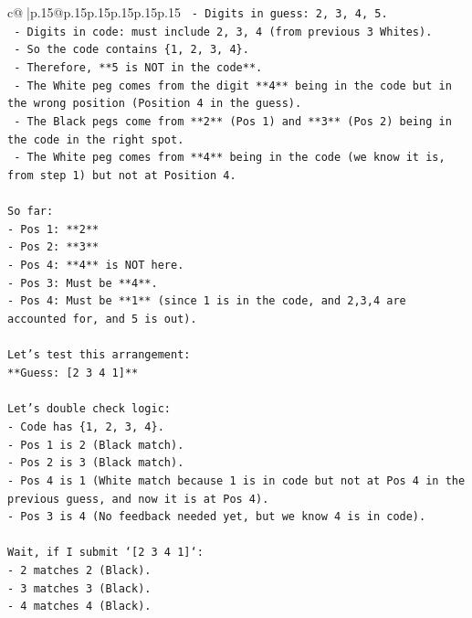 \documentclass{article}
\begin{document}
{\begin{supertabular}{c@{$\;$}|p{.15\linewidth}@{}p{.15\linewidth}p{.15\linewidth}p{.15\linewidth}p{.15\linewidth}p{.15\linewidth}}
{{{\texttt{    {-} Digits in guess: 2, 3, 4, 5.} \\
\texttt{    {-} Digits in code: must include 2, 3, 4 (from previous 3 Whites).} \\
\texttt{    {-} So the code contains \{1, 2, 3, 4\}.} \\
\texttt{    {-} Therefore, **5 is NOT in the code**.} \\
\texttt{    {-} The White peg comes from the digit **4** being in the code but in the wrong position (Position 4 in the guess).} \\
\texttt{    {-} The Black pegs come from **2** (Pos 1) and **3** (Pos 2) being in the code in the right spot.} \\
\texttt{    {-} The White peg comes from **4** being in the code (we know it is, from step 1) but not at Position 4.} \\
\\ 
\texttt{So far:} \\
\texttt{{-} Pos 1: **2**} \\
\texttt{{-} Pos 2: **3**} \\
\texttt{{-} Pos 4: **4** is NOT here.} \\
\texttt{{-} Pos 3: Must be **4**.} \\
\texttt{{-} Pos 4: Must be **1** (since 1 is in the code, and 2,3,4 are accounted for, and 5 is out).} \\
\\ 
\texttt{Let's test this arrangement:} \\
\texttt{**Guess: {[}2 3 4 1{]}**} \\
\\ 
\texttt{Let's double check logic:} \\
\texttt{{-} Code has \{1, 2, 3, 4\}.} \\
\texttt{{-} Pos 1 is 2 (Black match).} \\
\texttt{{-} Pos 2 is 3 (Black match).} \\
\texttt{{-} Pos 4 is 1 (White match because 1 is in code but not at Pos 4 in the previous guess, and now it is at Pos 4).} \\
\texttt{{-} Pos 3 is 4 (No feedback needed yet, but we know 4 is in code).} \\
\\ 
\texttt{Wait, if I submit `{[}2 3 4 1{]}`:} \\
\texttt{{-} 2 matches 2 (Black).} \\
\texttt{{-} 3 matches 3 (Black).} \\
\texttt{{-} 4 matches 4 (Black).} \\
}}}
\end{supertabular}}
\end{document}

